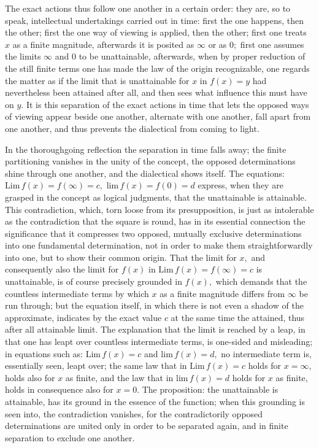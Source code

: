 \documentclass[12pt,a4paper,openany]{book}
\newcommand{\opage}[1]{\marginnote{\footnotesize\textit{[#1]}}}
\begin{document}
The exact actions thus follow one another in a certain order: %
 they are, so to speak, intellectual undertakings carried out in time: first the one happens, then the other; first the one way of viewing is applied, then the other; first one treats $x$ as a finite magnitude, afterwards it is posited as $\infty$ or as $0;$ first one assumes the limits $\infty$ and $0$ to be unattainable, afterwards, when by proper reduction of the still finite terms one has made the law of the origin recognizable, one regards the matter as if the limit that is unattainable for $x$ in $f(x)=y$ had nevertheless been attained after all, and then sees what influence this must have on $y.$ It is this separation of the exact actions in time that lets the opposed ways of viewing appear beside one another, alternate with one another, fall apart from one another, and thus prevents the dialectical from coming to light.

In the thoroughgoing reflection the separation in time falls away; the finite partitioning vanishes in the unity of the concept, the opposed determinations shine through one another, and the dialectical shows itself. The equations: $\mathrm{Lim}\,f(x)=f(\infty)=c,$ $\mathrm{lim}\,f(x)=f(0)=d$ express, when they are grasped in the concept as logical judgments, that the unattainable is attainable. This contradiction, which, torn loose from its presupposition, is
\setcounter{footnote}{0}%
\opage{60}just as intolerable as the contradiction that the square is round, has in its essential connection the significance that it compresses two opposed, mutually exclusive determinations into one fundamental determination, not in order to make them straightforwardly into one, but to show their common origin. That the limit for $x,$ and consequently also the limit for $f(x)$ in $\mathrm{Lim}\,f(x)=f(\infty)=c$ is unattainable, is of course precisely grounded in $f(x),$ which demands that the countless intermediate terms by which $x$ as a finite magnitude differs from $\infty$ be run through; but the equation itself, in which there is not even a shadow of the approximate, indicates by the exact value $c$ at the same time the attained, thus after all attainable limit. The explanation that the limit is reached by a leap, in that one has leapt over countless intermediate terms, is one-sided and misleading; in equations such as: $\mathrm{Lim}\,f(x)=c$ and $\mathrm{lim}\,f(x)=d,$ no intermediate term is, essentially seen, leapt over; the same law that in $\mathrm{Lim}\,f(x)=c$ holds for $x=\infty,$ holds also for $x$ as finite, and the law that in $\mathrm{lim}\,f(x)=d$ holds for $x$ as finite, holds in consequence also for $x=0.$ The proposition: the unattainable is attainable, has its ground in the essence of the function; when this grounding is seen into, the contradiction vanishes, for the contradictorily opposed determinations are united only in order to be separated again, and in finite separation to exclude one another.
\end{document}
